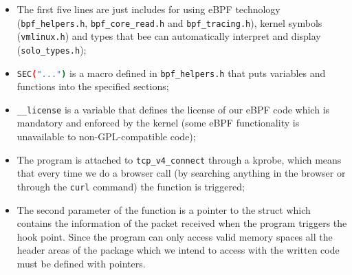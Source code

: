 \begin{itemize}
	\item 
		The first five lines are just includes for using eBPF technology (\colorbox{backcolour}{\lstinline[style=commandline, language=bash, breaklines=true]|bpf_helpers.h|}, \colorbox{backcolour}{\lstinline[style=commandline, language=bash, breaklines=true]|bpf_core_read.h|} and \colorbox{backcolour}{\lstinline[style=commandline, language=bash, breaklines=true]|bpf_tracing.h|}), kernel symbols (\colorbox{backcolour}{\lstinline[style=commandline, language=bash, breaklines=true]|vmlinux.h|}) and types that bee can automatically interpret and display (\colorbox{backcolour}{\lstinline[style=commandline, language=bash, breaklines=true]|solo_types.h|});
	\item 
		\colorbox{backcolour}{\lstinline[style=commandline, language=bash, breaklines=true]|SEC("...")|} is a macro defined in \colorbox{backcolour}{\lstinline[style=commandline, language=bash, breaklines=true]|bpf_helpers.h|} that puts variables and functions into the specified sections;
	\item 
		\colorbox{backcolour}{\lstinline[style=commandline, language=bash, breaklines=true]|__license|} is a variable that defines the license of our eBPF code which is mandatory and enforced by the kernel (some eBPF functionality is unavailable to non-GPL-compatible code);
	\item 
		The program is attached to \colorbox{backcolour}{\lstinline[style=commandline, language=bash, breaklines=true]|tcp_v4_connect|} through a kprobe, which means that every time we do a browser call (by searching anything in the browser or through the \colorbox{backcolour}{\lstinline[style=commandline, language=bash, breaklines=true]|curl|} command) the function is triggered;
	\item 
		The second parameter of the function is a pointer to the struct which contains the information of the packet received when the program triggers the hook point.
		Since the program can only access valid memory spaces all the header areas of the package which we intend to access with the written code must be defined with pointers.
\end{itemize}

